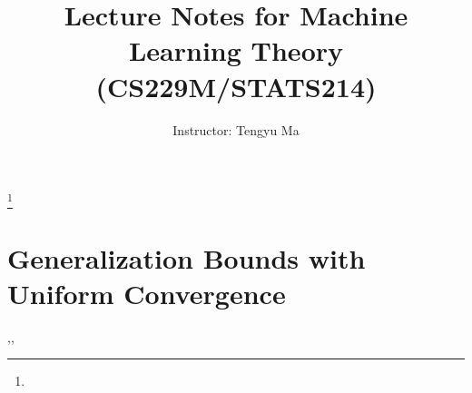 \documentclass{amsbook}
\theoremstyle{definition}
\theoremstyle{remark}
\numberwithin{section}{chapter}
\numberwithin{equation}{chapter}
\begin{document}
\frontmatter

\title{Lecture Notes for Machine Learning Theory (CS229M/STATS214)}


\author{Instructor: Tengyu Ma}
\address{}
\curraddr{}
\email{}
\thanks{}






\maketitle


\setcounter{page}{4}

\tableofcontents

%
\mainmatter
\let\sec\section
\let\subsec\subsection

\chapter{Generalization Bounds with Uniform Convergence}


%
,,
\appendix


\backmatter


\printindex
\end{document}
